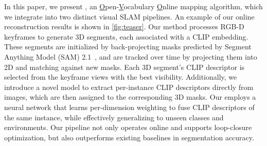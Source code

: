 In this paper, we present \ours, an \underline{O}pen-\underline{V}ocabulary \underline{O}nline mapping algorithm, which we integrate into two distinct visual SLAM pipelines. An example of our online reconstruction results is shown in \cref{fig:teaser}.
Our method processes RGB-D keyframes to generate 3D segments, each associated with a CLIP embedding.
These segments are initialized by back-projecting masks predicted by Segment Anything Model (SAM) 2.1~\cite{ravi2024sam2}, and are tracked over time by projecting them into 2D and matching against new masks.
Each 3D segment's CLIP descriptor is selected from the keyframe views with the best visibility.
Additionally, we introduce a novel model to extract per-instance CLIP descriptors directly from images, which are then assigned to the corresponding 3D masks.
{Our \clipours employs a neural network that learns per-dimension weighting to fuse CLIP descriptors of the same instance, while effectively generalizing to unseen classes and environments.}
Our pipeline not only operates online and supports loop-closure optimization, but also outperforms existing baselines in segmentation accuracy.